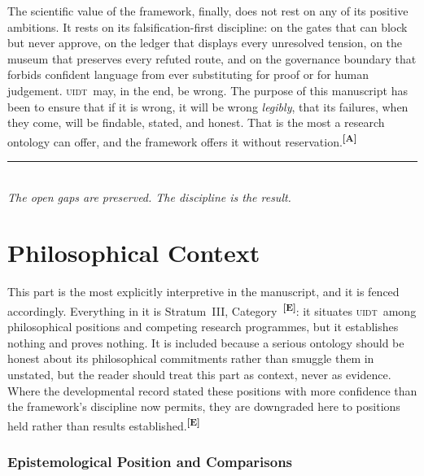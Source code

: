 \documentclass[12pt,a4paper,twoside]{article}
\theoremstyle{plain}
\theoremstyle{definition}
\theoremstyle{remark}
\newcommand{\UIDT}{\textsc{uidt}}
\newcommand{\catmark}[1]{\textsuperscript{\textsf{\textbf{[#1]}}}}
\begin{document}
The scientific value of the framework, finally, does not rest on any of its positive ambitions. It rests on its falsification-first discipline: on the gates that can block but never approve, on the ledger that displays every unresolved tension, on the museum that preserves every refuted route, and on the governance boundary that forbids confident language from ever substituting for proof or for human judgement. \UIDT\ may, in the end, be wrong. The purpose of this manuscript has been to ensure that if it is wrong, it will be wrong \emph{legibly}, that its failures, when they come, will be findable, stated, and honest. That is the most a research ontology can offer, and the framework offers it without reservation.\catmark{A}

\vspace{1.5em}
\begin{center}
\rule{0.4\textwidth}{0.4pt}\\[0.6em]
{\small\itshape The open gaps are preserved. The discipline is the result.}
\end{center}

\newpage
\part{Philosophical Context}
\label{part:philosophical-context}

\noindent This part is the most explicitly interpretive in the manuscript, and it is fenced accordingly. Everything in it is Stratum~III, Category~\catmark{E}: it situates \UIDT\ among philosophical positions and competing research programmes, but it establishes nothing and proves nothing. It is included because a serious ontology should be honest about its philosophical commitments rather than smuggle them in unstated, but the reader should treat this part as context, never as evidence. Where the developmental record stated these positions with more confidence than the framework's discipline now permits, they are downgraded here to positions held rather than results established.\catmark{E}

\newpage
\section{Epistemological Position and Comparisons}
\label{sec:epistemology}
\end{document}
